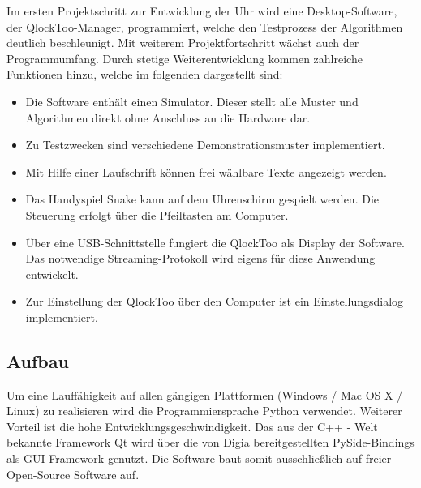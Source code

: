 \begin{multicols}{2}
Im ersten Projektschritt zur Entwicklung der Uhr wird eine Desktop-Software, der QlockToo-Manager, programmiert, welche den Testprozess der Algorithmen deutlich beschleunigt. Mit weiterem Projektfortschritt wächst auch der Programmumfang. Durch stetige Weiterentwicklung kommen zahlreiche Funktionen hinzu, welche im folgenden dargestellt sind:

\begin{itemize}
    \item Die Software enthält einen Simulator. Dieser stellt alle Muster und Algorithmen direkt ohne Anschluss an die Hardware dar.
    \item Zu Testzwecken sind verschiedene Demonstrationsmuster implementiert.
    \item Mit Hilfe einer Laufschrift können frei wählbare Texte angezeigt werden.
    \item Das Handyspiel Snake kann auf dem Uhrenschirm gespielt werden. Die Steuerung erfolgt über die Pfeiltasten am Computer.
    \item Über eine USB-Schnittstelle fungiert die QlockToo als Display der Software. Das notwendige Streaming-Protokoll wird eigens für diese Anwendung entwickelt.
    \item Zur Einstellung der QlockToo über den Computer ist ein Einstellungsdialog implementiert.
\end{itemize}

\subsection{Aufbau}
Um eine Lauffähigkeit auf allen gängigen Plattformen (Windows / Mac OS X / Linux) zu realisieren wird die Programmiersprache Python verwendet. Weiterer Vorteil ist die hohe Entwicklungsgeschwindigkeit.
Das aus der C++ - Welt bekannte Framework Qt wird über die von Digia bereitgestellten PySide-Bindings als GUI-Framework genutzt. Die Software baut somit ausschließlich auf freier Open-Source Software auf.


\end{multicols}
